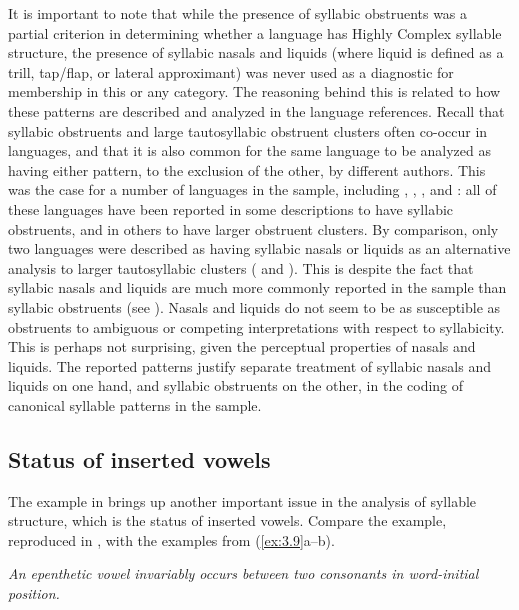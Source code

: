   It is important to note that while the presence of syllabic obstruents was a partial criterion in determining whether a language has Highly Complex syllable structure, the presence of syllabic nasals and liquids (where liquid is defined as a trill, tap/flap, or lateral approximant) was never used as a diagnostic for membership in this or any category. The reasoning behind this is related to how these patterns are described and analyzed in the language references. Recall that syllabic obstruents and large tautosyllabic obstruent clusters often co-occur in languages, and that it is also common for the same language to be analyzed as having either pattern, to the exclusion of the other, by different authors. This was the case for a number of languages in the sample, including , , , and : all of these languages have been reported in some descriptions to have syllabic obstruents, and in others to have larger obstruent clusters. By comparison, only two languages were described as having syllabic nasals or liquids as an alternative analysis to larger tautosyllabic clusters ( and ). This is despite the fact that syllabic nasals and liquids are much more commonly reported in the sample than syllabic obstruents (see ). Nasals and liquids do not seem to be as susceptible as obstruents to ambiguous or competing interpretations with respect to syllabicity. This is perhaps not surprising, given the perceptual properties of nasals and liquids. The reported patterns justify separate treatment of syllabic nasals and liquids on one hand, and syllabic obstruents on the other, in the coding of canonical syllable patterns in the sample.

\subsection{Status of inserted vowels}\label{sec:3.2.2}

  The  example in  brings up another important issue in the analysis of syllable structure, which is the status of inserted vowels. Compare the  example, reproduced in , with the examples from  (\ref{ex:3.9}a--b).

\ea\label{ex:3.8}

\textit{An epenthetic vowel invariably occurs between two consonants in word-initial position.}

